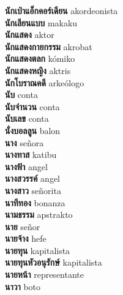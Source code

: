 \textbf{ นักเป่าแอ็กคอร์เดียน  } akordeonista \\
\textbf{ นักเลียนแบบ  } makaku \\
\textbf{ นักแสดง  } aktor \\
\textbf{ นักแสดงกายกรรม  } akrobat \\
\textbf{ นักแสดงตลก  } kómiko \\
\textbf{ นักแสดงหญิง  } aktris \\
\textbf{ นักโบราณคดี  } arkeólogo \\
\textbf{ นับ  } conta \\
\textbf{ นับจำนวน  } conta \\
\textbf{ นับเลข  } conta \\
\textbf{ นั่งบอลลูน  } balon \\
\textbf{ นาง  } señora \\
\textbf{ นางทาส  } katibu \\
\textbf{ นางฟ้า  } angel \\
\textbf{ นางสวรรค์  } angel \\
\textbf{ นางสาว  } señorita \\
\textbf{ นาทีทอง  } bonanza \\
\textbf{ นามธรรม  } apstrakto \\
\textbf{ นาย  } señor \\
\textbf{ นายจ้าง  } hefe \\
\textbf{ นายทุน  } kapitalista \\
\textbf{ นายทุนหัวอนุรักษ์  } kapitalista \\
\textbf{ นายหน้า  } representante \\
\textbf{ นาวา  } boto \\
